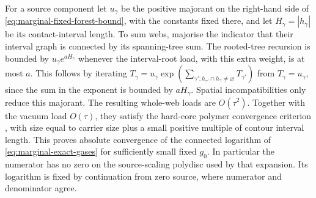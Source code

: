 \documentclass[11pt]{article}
\begin{document}
For a source component let $u_\gamma$ be the positive majorant on the right-hand side of \eqref{eq:marginal-fixed-forest-bound}, with the constants fixed there, and let $H_\gamma=|h_\gamma|$ be its contact-interval length. To sum webs, majorise the indicator that their interval graph is connected by its spanning-tree sum. The rooted-tree recursion is bounded by $u_\gamma e^{aH_\gamma}$ whenever the interval-root load, with this extra weight, is at most $a$. This follows by iterating $T_\gamma=u_\gamma\exp(\sum_{\gamma':h_{\gamma'}\cap h_\gamma\ne \varnothing}T_{\gamma'})$ from $T_\gamma=u_\gamma$, since the sum in the exponent is bounded by $aH_\gamma$. Spatial incompatibilities only reduce this majorant. The resulting whole-web loads are $O(\tau^2)$. Together with the vacuum load $O(\tau)$, they satisfy the hard-core polymer convergence criterion \cite{KoteckyPreiss}, with size equal to carrier size plus a small positive multiple of contour interval length. This proves absolute convergence of the connected logarithm of \eqref{eq:marginal-exact-gases} for sufficiently small fixed $g_0$. In particular the numerator has no zero on the source-scaling polydisc used by that expansion. Its logarithm is fixed by continuation from zero source, where numerator and denominator agree.
\end{document}
